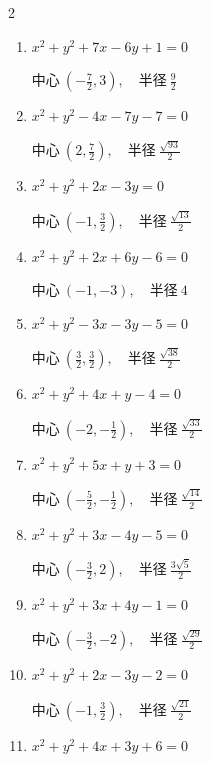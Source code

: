 \begin{multicols}{2}
\begin{enumerate}
  \item $x^{2}+y^{2}+7x-6y+1=0$

        $\displaystyle 中心\: \left(-\frac{7}{2},3\right), \quad 半径 \ \frac{9}{2}$

  \item $x^{2}+y^{2}-4x-7y-7=0$

        $\displaystyle 中心\: \left(2,\frac{7}{2}\right), \quad 半径 \ \frac{\sqrt{93}}{2}$

  \item $x^{2}+y^{2}+2x-3y=0$

        $\displaystyle 中心\: \left(-1,\frac{3}{2}\right), \quad 半径 \ \frac{\sqrt{13}}{2}$

  \item $x^{2}+y^{2}+2x+6y-6=0$

        $\displaystyle 中心\: \left(-1,-3\right), \quad 半径 \ 4$

  \item $x^{2}+y^{2}-3x-3y-5=0$

        $\displaystyle 中心\: \left(\frac{3}{2},\frac{3}{2}\right), \quad 半径 \ \frac{\sqrt{38}}{2}$

  \item $x^{2}+y^{2}+4x+y-4=0$

        $\displaystyle 中心\: \left(-2,-\frac{1}{2}\right), \quad 半径 \ \frac{\sqrt{33}}{2}$

  \item $x^{2}+y^{2}+5x+y+3=0$

        $\displaystyle 中心\: \left(-\frac{5}{2},-\frac{1}{2}\right), \quad 半径 \ \frac{\sqrt{14}}{2}$

  \item $x^{2}+y^{2}+3x-4y-5=0$

        $\displaystyle 中心\: \left(-\frac{3}{2},2\right), \quad 半径 \ \frac{3\sqrt{5}}{2}$

  \item $x^{2}+y^{2}+3x+4y-1=0$

        $\displaystyle 中心\: \left(-\frac{3}{2},-2\right), \quad 半径 \ \frac{\sqrt{29}}{2}$

\columnbreak %

\resetques

  \item $x^{2}+y^{2}+2x-3y-2=0$

        $\displaystyle 中心\: \left(-1,\frac{3}{2}\right), \quad 半径 \ \frac{\sqrt{21}}{2}$

  \item $x^{2}+y^{2}+4x+3y+6=0$


\end{enumerate}
\end{multicols}
